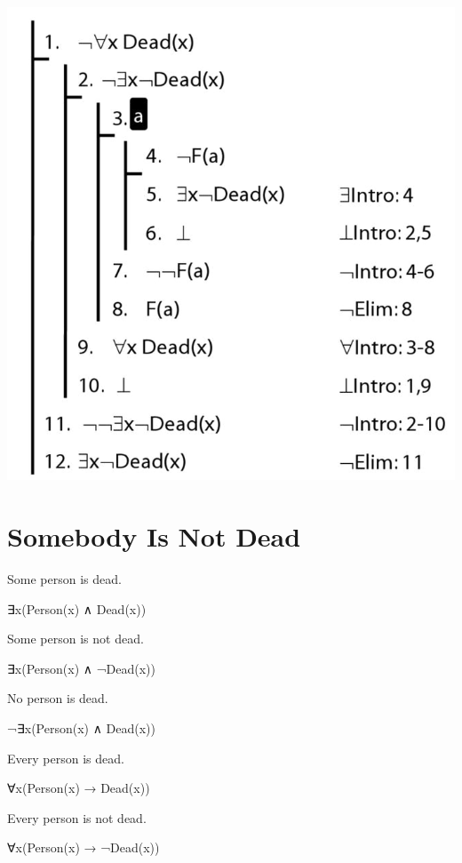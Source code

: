 \documentclass[12pt]{extarticle}
\begin{document}
\begin{multicols*}{3}
\begin{center}
\includegraphics[scale=0.3]{img/unit_826_proof.png}
\end{center}
 
 
\section{Somebody Is Not Dead}
 
Some person is dead.
 
\hspace{5mm} ∃x(Person(x) ∧ Dead(x))
 
Some person is not dead.
 
\hspace{5mm} ∃x(Person(x) ∧ ¬Dead(x))
 
No person is dead.
 
\hspace{5mm} ¬∃x(Person(x) ∧ Dead(x))
 
Every person is dead.
 
\hspace{5mm} ∀x(Person(x) → Dead(x))
 
Every person is not dead.
 
\hspace{5mm} ∀x(Person(x) → ¬Dead(x))
 

\end{multicols*}
\end{document}
